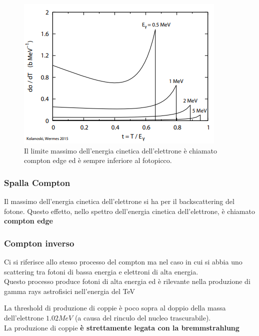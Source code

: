 \vspace{-10pt}
\hspace{-20pt}
\begin{minipage}{0.48\textwidth}
    \begin{figure}[H]
        \centering
        \includegraphics[width=\textwidth,frame]{Chapters/images/Interazione_radiazione_materia/image-20220220124719776.png}
        \captionsetup{width=\textwidth}
        \caption{Il limite massimo dell'energia cinetica dell'elettrone è chiamato compton edge ed è sempre inferiore al fotopicco.}
        \label{fig:comptonedge}
    \end{figure}
\end{minipage} \hfill
\begin{minipage}{0.48\textwidth}
    \vspace{5pt}
    \subsubsection*{Spalla Compton}
    \raggedright
    Il massimo dell'energia cinetica dell'elettrone si ha per il backscattering del fotone. Questo effetto, nello spettro dell'energia cinetica dell'elettrone, è chiamato \textbf{compton edge}
\vspace{-5pt}
\subsubsection*{Compton inverso}
Ci si riferisce allo stesso processo del compton ma nel caso in cui si abbia uno scattering tra fotoni di bassa energia e elettroni di alta energia.
\\
Questo processo produce fotoni di alta energia ed è rilevante nella produzione di gamma rays astrofisici nell'energia del TeV

\end{minipage}
La threshold di produzione di coppie è poco sopra al doppio della massa dell'elettrone $1.02MeV$ (a causa del rinculo del nucleo trascurabile).
\\
La produzione di coppie \textbf{è  strettamente legata con la bremmstrahlung}

